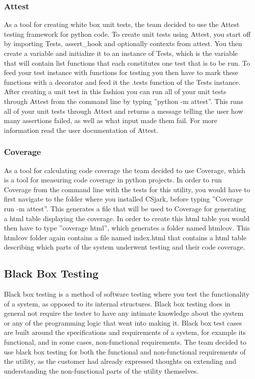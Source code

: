 \subsubsection{Attest}
As a tool for creating white box unit tests, the team decided to use the Attest testing framework for python code. To create unit tests using Attest, you start off by importing Tests, assert\_hook and optionally contexts from attest. You then create a variable and initialize it to an instance of Tests, which is the variable that will contain list functions that each constitutes one test that is to be run. To feed your test instance with functions for testing you then have to mark these functions with a decorator and feed it the .tests function of the Tests instance. After creating a unit test in this fashion you can run all of your unit tests through Attest from the command line by typing ''python -m attest''. This runs all of your unit tests through Attest and returns a message telling the user how many assertions failed, as well as what input made them fail. For more information read the user documentation of Attest. 

\subsubsection{Coverage}
As a tool for calculating code coverage the team decided to use Coverage, which is a tool for measuring code coverage in python projects. In order to run Coverage from the command line with the tests for this utility, you would have to first navigate to the folder where you installed CSjark, before typing ''Coverage run -m attest''. This generates a file that will be used to Coverage for generating a html table displaying the coverage. In order to create this html table you would then have to type ''coverage html'', which generates a folder named htmlcov. This htmlcov folder again contains a file named index.html that contains a html table describing which parts of the system underwent testing and their code coverage.


\subsection{Black Box Testing}
Black box testing is a method of software testing where you test the functionality of a system, as opposed to its internal structures. Black box testing does in general not require the tester to have any intimate knowledge about the system or any of the programming logic that went into making it. Black box test cases are built around the specifications and requirements of a system, for example its functional, and in some cases, non-functional requirements. The team decided to use black box testing for both the functional and non-functional requirements of the \gls{utility}, as the customer had already expressed thoughts on extending and understanding the non-functional parts of the \gls{utility} themselves. 


